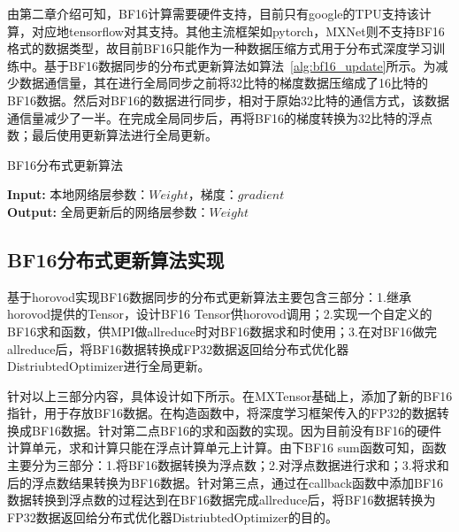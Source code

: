 由第二章介绍可知，BF16计算需要硬件支持，目前只有google的TPU支持该计算，对应地tensorflow对其支持。其他主流框架如pytorch，MXNet则不支持BF16格式的数据类型，故目前BF16只能作为一种数据压缩方式用于分布式深度学习训练中。基于BF16数据同步的分布式更新算法如算法~\ref{alg:bf16_update}所示。为减少数据通信量，其在进行全局同步之前将32比特的梯度数据压缩成了16比特的BF16数据。然后对BF16的数据进行同步，相对于原始32比特的通信方式，该数据通信量减少了一半。在完成全局同步后，再将BF16的梯度转换为32比特的浮点数；最后使用更新算法进行全局更新。

\begin{algorithm}\small
\caption{BF16分布式更新算法}
\textbf{Input:}
本地网络层参数：$Weight$，梯度：$gradient$ \\
\textbf{Output:} 
全局更新后的网络层参数：$Weight$
\begin{algorithmic}[1]
\end{algorithmic}
	\label{alg:bf16_update}
\end{algorithm}

\subsection{BF16分布式更新算法实现}
基于horovod实现BF16数据同步的分布式更新算法主要包含三部分：1.继承horovod提供的Tensor，设计BF16 Tensor供horovod调用；2.实现一个自定义的BF16求和函数，供MPI做allreduce时对BF16数据求和时使用；3.在对BF16做完allreduce后，将BF16数据转换成FP32数据返回给分布式优化器DistriubtedOptimizer进行全局更新。

针对以上三部分内容，具体设计如下所示。在MXTensor基础上，添加了新的BF16指针，用于存放BF16数据。在构造函数中，将深度学习框架传入的FP32的数据转换成BF16数据。针对第二点BF16的求和函数的实现。因为目前没有BF16的硬件计算单元，求和计算只能在浮点计算单元上计算。由下BF16 sum函数可知，函数主要分为三部分：1.将BF16数据转换为浮点数；2.对浮点数据进行求和；3.将求和后的浮点数结果转换为BF16数据。针对第三点，通过在callback函数中添加BF16数据转换到浮点数的过程达到在BF16数据完成allreduce后，将BF16数据转换为FP32数据返回给分布式优化器DistriubtedOptimizer的目的。

